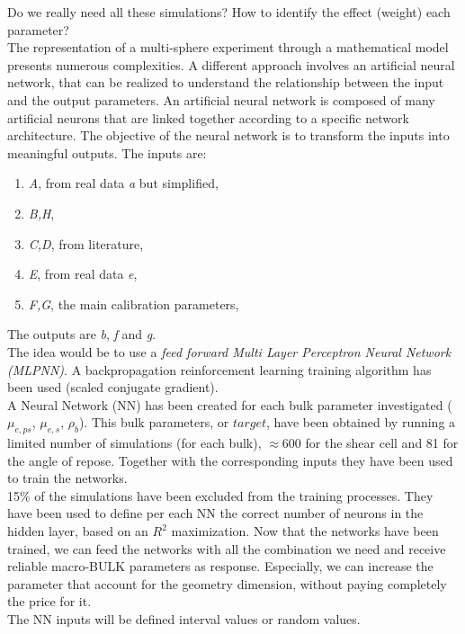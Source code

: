 Do we really need all these simulations?
How to identify the effect (weight) each parameter?\\
The representation of a multi-sphere experiment through a mathematical model presents numerous complexities.
A different approach involves an artificial neural network, that can be realized to understand the relationship between the input and the output parameters.
An artificial neural network is composed of many artificial neurons that are linked together according to a specific network architecture. The objective of the neural network is to transform the inputs into meaningful outputs.
The inputs are:
\begin{enumerate}
\item{\textit{A}, from real data \textit{a} but simplified,}
\item{\textit{B,H},}
\item{\textit{C,D}, from literature,}
\item{\textit{E}, from real data \textit{e},}
\item{\textit{F,G}, the main calibration parameters,}
\end{enumerate}
The outputs are \textit{b}, \textit{f} and \textit{g}.\\
The idea would be to use a \textit{feed forward Multi Layer Perceptron Neural Network (MLPNN)}.
A backpropagation reinforcement learning training algorithm has been used (scaled conjugate gradient).\\
A Neural Network (NN) has been created for each bulk parameter investigated ($\mu_{e,ps}$, $\mu_{e,s}$, $\rho_{b}$).
This bulk parameters, or $target$, have been obtained by running a limited number of simulations (for each bulk), $\approx 600$ for the shear cell and 81 for the angle of repose.
Together with the corresponding inputs they have been used to train the networks.\\
15\% of the simulations have been excluded from the training processes.
They have been used to define per each NN the correct number of neurons in the hidden layer, based on an $R^2$ maximization.
Now that the networks have been trained, we can feed the networks with all the combination we need and receive reliable macro-BULK parameters as response.
Especially, we can increase the parameter that account for the geometry dimension, without paying completely the price for it.\\
The NN inputs will be defined interval values or random values.\\

